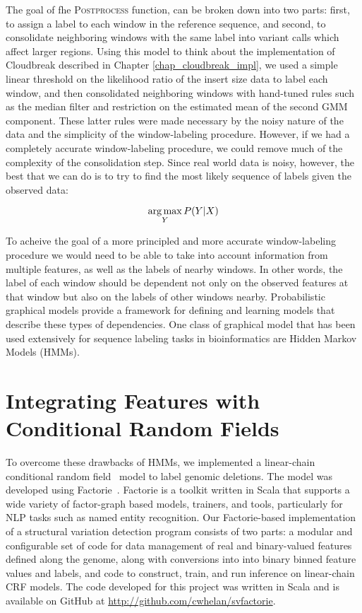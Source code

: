 The goal of fhe \textsc{Postprocess} function, can be broken down into two parts: first, to assign a label to each window in the reference sequence, and second, to consolidate neighboring windows with the same label into variant calls which affect larger regions. Using this model to think about the implementation of Cloudbreak described in Chapter \ref{chap_cloudbreak_impl}, we used a simple linear threshold on the likelihood ratio of the insert size data to label each window, and then consolidated neighboring windows with hand-tuned rules such as the median filter and restriction on the estimated mean of the second GMM component. These latter rules were made necessary by the noisy nature of the data and the simplicity of the window-labeling procedure. However, if we had a completely accurate window-labeling procedure, we could remove much of the complexity of the consolidation step. Since real world data is noisy, however, the best that we can do is to try to find the most likely sequence of labels given the observed data:

\[ \operatorname*{arg\,max}_Y P(Y|X) \]

To acheive the goal of a more principled and more accurate window-labeling procedure we would need to be able to take into account information from multiple features, as well as the labels of nearby windows. In other words, the label of each window should be dependent not only on the observed features at that window but also on the labels of other windows nearby. Probabilistic graphical models provide a framework for defining and learning models that describe these types of dependencies.  One class of graphical model that has been used extensively for sequence labeling tasks in bioinformatics are Hidden Markov Models (HMMs). 

\section{Integrating Features with Conditional Random Fields}

To overcome these drawbacks of HMMs, we implemented a linear-chain conditional random field~\cite{Lafferty:2001:CRF:645530.655813} model to label genomic deletions. The model was developed using Factorie~\cite{mccallum09:factorie}. Factorie is a toolkit written in Scala that supports a wide variety of factor-graph based models, trainers, and tools, particularly for NLP tasks such as named entity recognition. Our Factorie-based implementation of a structural variation detection program consists of two parts: a modular and configurable set of code for data management of real and binary-valued features defined along the genome, along with conversions into into binary binned feature values and labels, and code to construct, train, and run inference on linear-chain CRF models. The code developed for this project was written in Scala and is available on GitHub at \url{http://github.com/cwhelan/svfactorie}. 

